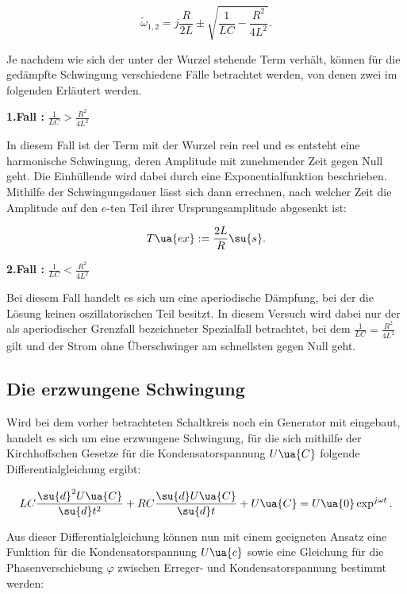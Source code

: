 \begin{equation}
  \tilde{\omega}_{1,2} = j \frac{R}{2L} \pm \sqrt{ \frac{1}{LC} - \frac{R^2}{4L^2}} .
\end{equation}

Je nachdem wie sich der unter der Wurzel stehende Term verhält, können für die
gedämpfte Schwingung verschiedene Fälle betrachtet werden, von denen zwei im folgenden
Erläutert werden.

\textbf{1.Fall :} $\frac{1}{LC} > \frac{R^2}{4L^2}$

In diesem Fall ist der Term mit der Wurzel rein reel und  es entsteht eine
harmonische Schwingung, deren Amplitude mit zunehmender
Zeit gegen Null geht. Die Einhüllende wird dabei durch eine Exponentialfunktion
beschrieben. Mithilfe der Schwingungsdauer lässt sich dann errechnen, nach welcher
Zeit die Amplitude auf den $e$-ten Teil ihrer Ursprungsamplitude abgesenkt ist:

\begin{equation}
  T\ua{ex} := \frac{2L}{R} \su{s} .
\end{equation}

\newpage

\textbf{2.Fall :} $\frac{1}{LC} < \frac{R^2}{4L^2}$

Bei diesem Fall handelt es sich um eine aperiodische Dämpfung, bei der die Lösung
keinen oszillatorischen Teil besitzt. In diesem Versuch wird dabei nur der als
aperiodischer Grenzfall bezeichneter Spezialfall betrachtet, bei dem
$\frac{1}{LC} = \frac{R^2}{4L^2}$ gilt und der Strom ohne Überschwinger am schnellsten
gegen Null geht.

\subsection{Die erzwungene Schwingung}

Wird bei dem vorher betrachteten Schaltkreis noch ein Generator mit eingebaut,
handelt es sich um eine erzwungene Schwingung, für die sich mithilfe der
Kirchhoffschen Gesetze für die Kondensatorspannung $U\ua{C}$
folgende Differentialgleichung ergibt:

\begin{equation}
  LC\frac{\su{d}^2U\ua{C}}{\su{d}t^2} + RC\frac{\su{d}U\ua{C}}{\su{d}t} + U\ua{C} = U\ua{0} \exp^{j\omega t} .
\end{equation}

Aus dieser Differentialgleichung können nun mit einem geeigneten Ansatz eine Funktion
für die Kondensatorspannung $U\ua{c}$ sowie eine Gleichung für die Phasenverschiebung
$\varphi$ zwischen Erreger- und Kondensatorspannung bestimmt werden:

